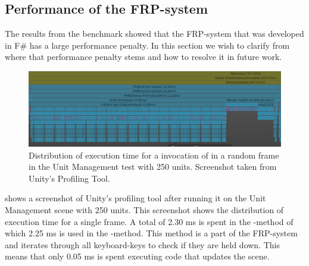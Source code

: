 

\subsection{Performance of the FRP-system}
The results from the benchmark showed that the \gls{FRP}-system that was developed in F\# has a large performance penalty. In this section we wish to clarify from where that performance penalty stems and how to resolve it in future work.

\begin{figure}[H]
    \includegraphics[width=\textwidth]{00-images/FRP-profiling.png}
    \caption{Distribution of execution time for a invocation of  in a random frame in the Unit Management test with 250 units. Screenshot taken from Unity's Profiling Tool.}
    \label{fig:frp:profiling}
\end{figure}

 shows a screenshot of Unity's profiling tool after running it on the Unit Management scene with 250 units. This screenshot shows the distribution of execution time for a single frame. A total of 2.30 ms is spent in the -method of which 2.25 ms is used in the -method. This method is a part of the \gls{FRP}-system and iterates through all keyboard-keys to check if they are held down. This means that only 0.05 ms is spent executing code that updates the scene.


